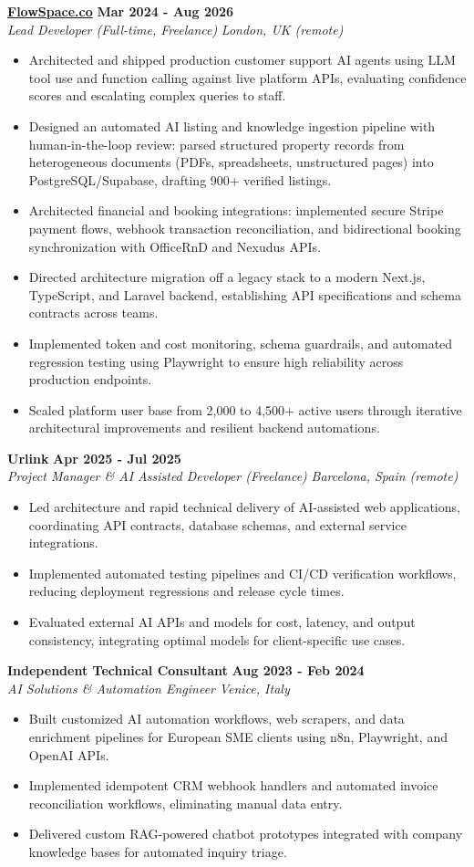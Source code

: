 \documentclass[10pt,a4paper]{article}
\newcommand{\role}[4]{%
  \textbf{#1} \hfill \textbf{#2}\\[1pt]%
  \textit{#3} \hfill \textit{#4}\\[2pt]%
}
\begin{document}
\role{\href{https://flowspace.co}{FlowSpace.co}}{Mar 2024 - Aug 2026}{Lead Developer (Full-time, Freelance)}{London, UK (remote)}
\begin{itemize}
  \item Architected and shipped production customer support AI agents using LLM tool use and function calling against live platform APIs, evaluating confidence scores and escalating complex queries to staff.
  \item Designed an automated AI listing and knowledge ingestion pipeline with human-in-the-loop review: parsed structured property records from heterogeneous documents (PDFs, spreadsheets, unstructured pages) into PostgreSQL/Supabase, drafting 900+ verified listings.
  \item Architected financial and booking integrations: implemented secure Stripe payment flows, webhook transaction reconciliation, and bidirectional booking synchronization with OfficeRnD and Nexudus APIs.
  \item Directed architecture migration off a legacy stack to a modern Next.js, TypeScript, and Laravel backend, establishing API specifications and schema contracts across teams.
  \item Implemented token and cost monitoring, schema guardrails, and automated regression testing using Playwright to ensure high reliability across production endpoints.
  \item Scaled platform user base from 2,000 to 4,500+ active users through iterative architectural improvements and resilient backend automations.
\end{itemize}

\role{Urlink}{Apr 2025 - Jul 2025}{Project Manager \& AI Assisted Developer (Freelance)}{Barcelona, Spain (remote)}
\begin{itemize}
  \item Led architecture and rapid technical delivery of AI-assisted web applications, coordinating API contracts, database schemas, and external service integrations.
  \item Implemented automated testing pipelines and CI/CD verification workflows, reducing deployment regressions and release cycle times.
  \item Evaluated external AI APIs and models for cost, latency, and output consistency, integrating optimal models for client-specific use cases.
\end{itemize}

\role{Independent Technical Consultant}{Aug 2023 - Feb 2024}{AI Solutions \& Automation Engineer}{Venice, Italy}
\begin{itemize}
  \item Built customized AI automation workflows, web scrapers, and data enrichment pipelines for European SME clients using n8n, Playwright, and OpenAI APIs.
  \item Implemented idempotent CRM webhook handlers and automated invoice reconciliation workflows, eliminating manual data entry.
  \item Delivered custom RAG-powered chatbot prototypes integrated with company knowledge bases for automated inquiry triage.
\end{itemize}
\end{document}
